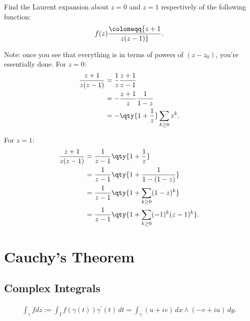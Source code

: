 \begin{exercise}

Find the Laurent expansion about \(z=0\) and \(z=1\) respectively of the
following function:
\begin{align*}
f(z) \coloneqq{z+1 \over z(z-1)}
.\end{align*}

\end{exercise}

\begin{solution}

Note: once you see that everything is in terms of powers of \((z-z_0)\),
you're essentially done. For \(z=0\):
\begin{align*}
{z+1 \over z(z-1)}
&= {1\over z} {z+1 \over z-1} \\
&= -{z+1\over z} {1\over 1-z} \\
&= -\qty{1 + {1\over z}}\sum_{k\geq 0} z^k
.\end{align*}

For \(z=1\):
\begin{align*}
{z+1 \over z(z-1)}
&= {1\over z-1}\qty{1 + {1\over z} } \\
&= {1\over z-1}\qty{1 + {1\over 1 - (1-z)} } \\
&= {1\over z-1} \qty{1 + \sum_{k\geq 0} (1-z)^k } \\
&= {1\over z-1} \qty{1 + \sum_{k\geq 0} (-1)^k (z-1)^k }
.\end{align*}

\end{solution}

\hypertarget{cauchys-theorem}{%
\section{Cauchy's Theorem}\label{cauchys-theorem}}

\hypertarget{complex-integrals}{%
\subsection{Complex Integrals}\label{complex-integrals}}

\begin{definition}

\begin{align*}
\int_{\gamma} f d z:=\int_{I} f(\gamma(t)) \gamma^{\prime}(t) \,dt
= \int_\gamma (u+iv)\,dx\wedge (-v+iu)\,dy
.\end{align*}

\end{definition}

